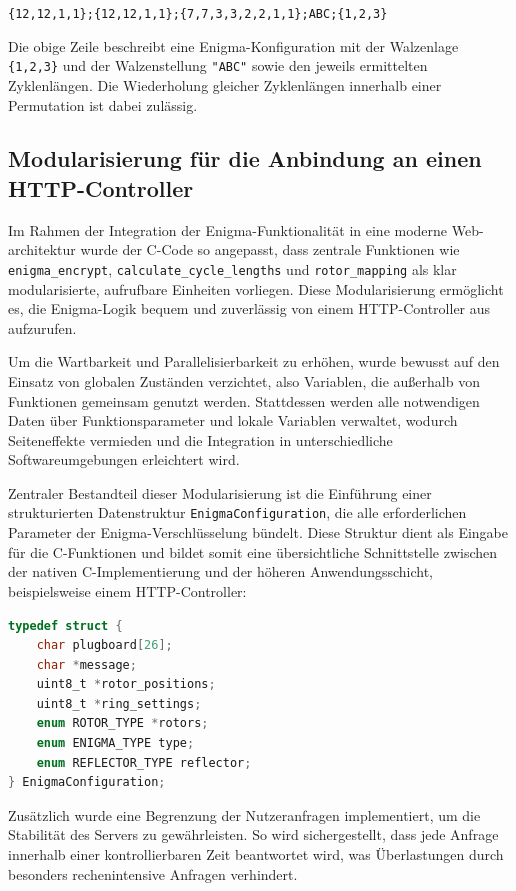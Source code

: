 \documentclass[12pt, ngerman, a4paper, numbers=noenddot]{article}
\begin{document}
\lstinline|{12,12,1,1};{12,12,1,1};{7,7,3,3,2,2,1,1};ABC;{1,2,3}|

Die obige Zeile beschreibt eine Enigma-Konfiguration mit der Walzenlage \lstinline|{1,2,3}| und der Walzenstellung \lstinline|"ABC"| sowie den jeweils ermittelten Zyklenlängen. Die Wiederholung gleicher Zyklenlängen innerhalb einer Permutation ist dabei zulässig.

\newpage

\subsection{Modularisierung für die Anbindung an einen HTTP-Controller}  
\label{subsec:c_api_prep}

Im Rahmen der Integration der Enigma-Funktionalität in eine moderne Web\hyp{}architektur wurde der C-Code so angepasst, dass zentrale Funktionen wie \lstinline|enigma_encrypt|, \lstinline|calculate_cycle_lengths| und \lstinline|rotor_mapping| als klar modularisierte, aufrufbare Einheiten vorliegen. Diese Modularisierung ermöglicht es, die Enigma-Logik bequem und zuverlässig von einem HTTP-Controller aus aufzurufen.

Um die Wartbarkeit und Parallelisierbarkeit zu erhöhen, wurde bewusst auf den Einsatz von globalen Zuständen verzichtet, also Variablen, die außerhalb von Funktionen gemeinsam genutzt werden. Stattdessen werden alle notwendigen Daten über Funktionsparameter und lokale Variablen verwaltet, wodurch Seiteneffekte vermieden und die Integration in unterschiedliche Softwareumgebungen erleichtert wird.


Zentraler Bestandteil dieser Modularisierung ist die Einführung einer strukturierten Datenstruktur \lstinline|EnigmaConfiguration|, die alle erforderlichen Parameter der Enigma-Verschlüsselung bündelt. Diese Struktur dient als Eingabe für die C-Funktionen und bildet somit eine übersichtliche Schnittstelle zwischen der nativen C-Implementierung und der höheren Anwendungsschicht, beispielsweise einem HTTP-Controller:

\begin{lstlisting}[language=C, caption={Struct \lstinline|EnigmaConfiguration| in C}, label={lst:enigma-c}]
typedef struct {
	char plugboard[26];
	char *message;
	uint8_t *rotor_positions;
	uint8_t *ring_settings;
	enum ROTOR_TYPE *rotors;
	enum ENIGMA_TYPE type;
	enum REFLECTOR_TYPE reflector;
} EnigmaConfiguration;
\end{lstlisting}

Zusätzlich wurde eine Begrenzung der Nutzeranfragen implementiert, um die Stabilität des Servers zu gewährleisten. So wird sichergestellt, dass jede Anfrage innerhalb einer kontrollierbaren Zeit beantwortet wird, was Überlastungen durch besonders rechenintensive Anfragen verhindert.
\end{document}
